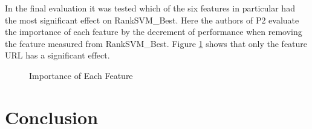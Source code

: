 \documentclass{proseminar}
\begin{document}
In the final evaluation it was tested which of the six features in particular had the most significant effect on RankSVM\_Best. Here the authors of P2 evaluate the importance of each feature by the decrement of performance when removing the feature measured from RankSVM\_Best. 
Figure \ref{fig:p2_resultFeature} shows that only the feature URL has a significant effect.

\begin{figure}[h]
\centering
{}
\caption{Importance of Each Feature}
\label{fig:p2_resultFeature}
\end{figure}




\section{Conclusion}




 

\balancecolumns
\end{document}
